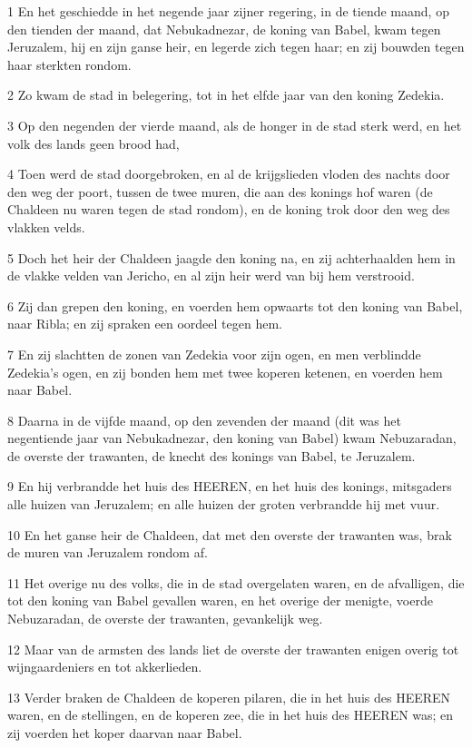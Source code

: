 \par 1 En het geschiedde in het negende jaar zijner regering, in de tiende maand, op den tienden der maand, dat Nebukadnezar, de koning van Babel, kwam tegen Jeruzalem, hij en zijn ganse heir, en legerde zich tegen haar; en zij bouwden tegen haar sterkten rondom.
\par 2 Zo kwam de stad in belegering, tot in het elfde jaar van den koning Zedekia.
\par 3 Op den negenden der vierde maand, als de honger in de stad sterk werd, en het volk des lands geen brood had,
\par 4 Toen werd de stad doorgebroken, en al de krijgslieden vloden des nachts door den weg der poort, tussen de twee muren, die aan des konings hof waren (de Chaldeen nu waren tegen de stad rondom), en de koning trok door den weg des vlakken velds.
\par 5 Doch het heir der Chaldeen jaagde den koning na, en zij achterhaalden hem in de vlakke velden van Jericho, en al zijn heir werd van bij hem verstrooid.
\par 6 Zij dan grepen den koning, en voerden hem opwaarts tot den koning van Babel, naar Ribla; en zij spraken een oordeel tegen hem.
\par 7 En zij slachtten de zonen van Zedekia voor zijn ogen, en men verblindde Zedekia's ogen, en zij bonden hem met twee koperen ketenen, en voerden hem naar Babel.
\par 8 Daarna in de vijfde maand, op den zevenden der maand (dit was het negentiende jaar van Nebukadnezar, den koning van Babel) kwam Nebuzaradan, de overste der trawanten, de knecht des konings van Babel, te Jeruzalem.
\par 9 En hij verbrandde het huis des HEEREN, en het huis des konings, mitsgaders alle huizen van Jeruzalem; en alle huizen der groten verbrandde hij met vuur.
\par 10 En het ganse heir de Chaldeen, dat met den overste der trawanten was, brak de muren van Jeruzalem rondom af.
\par 11 Het overige nu des volks, die in de stad overgelaten waren, en de afvalligen, die tot den koning van Babel gevallen waren, en het overige der menigte, voerde Nebuzaradan, de overste der trawanten, gevankelijk weg.
\par 12 Maar van de armsten des lands liet de overste der trawanten enigen overig tot wijngaardeniers en tot akkerlieden.
\par 13 Verder braken de Chaldeen de koperen pilaren, die in het huis des HEEREN waren, en de stellingen, en de koperen zee, die in het huis des HEEREN was; en zij voerden het koper daarvan naar Babel.
